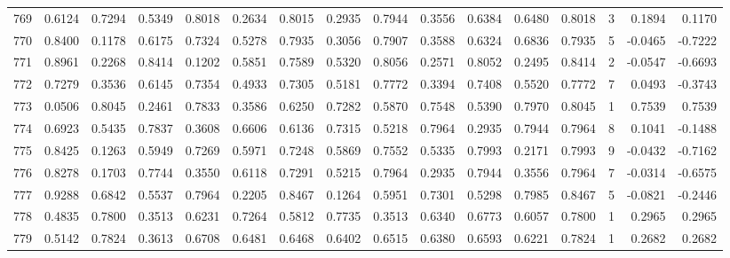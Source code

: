 \begin{tabular}{lrrrrrrrrrrrrrrr}
769 &      0.6124 &  0.7294 &  0.5349 &  0.8018 &  0.2634 &  0.8015 &  0.2935 &  0.7944 &  0.3556 &  0.6384 &   0.6480 &     0.8018 &      3 &                    0.1894 &                     0.1170 \\
770 &      0.8400 &  0.1178 &  0.6175 &  0.7324 &  0.5278 &  0.7935 &  0.3056 &  0.7907 &  0.3588 &  0.6324 &   0.6836 &     0.7935 &      5 &                   -0.0465 &                    -0.7222 \\
771 &      0.8961 &  0.2268 &  0.8414 &  0.1202 &  0.5851 &  0.7589 &  0.5320 &  0.8056 &  0.2571 &  0.8052 &   0.2495 &     0.8414 &      2 &                   -0.0547 &                    -0.6693 \\
772 &      0.7279 &  0.3536 &  0.6145 &  0.7354 &  0.4933 &  0.7305 &  0.5181 &  0.7772 &  0.3394 &  0.7408 &   0.5520 &     0.7772 &      7 &                    0.0493 &                    -0.3743 \\
773 &      0.0506 &  0.8045 &  0.2461 &  0.7833 &  0.3586 &  0.6250 &  0.7282 &  0.5870 &  0.7548 &  0.5390 &   0.7970 &     0.8045 &      1 &                    0.7539 &                     0.7539 \\
774 &      0.6923 &  0.5435 &  0.7837 &  0.3608 &  0.6606 &  0.6136 &  0.7315 &  0.5218 &  0.7964 &  0.2935 &   0.7944 &     0.7964 &      8 &                    0.1041 &                    -0.1488 \\
775 &      0.8425 &  0.1263 &  0.5949 &  0.7269 &  0.5971 &  0.7248 &  0.5869 &  0.7552 &  0.5335 &  0.7993 &   0.2171 &     0.7993 &      9 &                   -0.0432 &                    -0.7162 \\
776 &      0.8278 &  0.1703 &  0.7744 &  0.3550 &  0.6118 &  0.7291 &  0.5215 &  0.7964 &  0.2935 &  0.7944 &   0.3556 &     0.7964 &      7 &                   -0.0314 &                    -0.6575 \\
777 &      0.9288 &  0.6842 &  0.5537 &  0.7964 &  0.2205 &  0.8467 &  0.1264 &  0.5951 &  0.7301 &  0.5298 &   0.7985 &     0.8467 &      5 &                   -0.0821 &                    -0.2446 \\
778 &      0.4835 &  0.7800 &  0.3513 &  0.6231 &  0.7264 &  0.5812 &  0.7735 &  0.3513 &  0.6340 &  0.6773 &   0.6057 &     0.7800 &      1 &                    0.2965 &                     0.2965 \\
779 &      0.5142 &  0.7824 &  0.3613 &  0.6708 &  0.6481 &  0.6468 &  0.6402 &  0.6515 &  0.6380 &  0.6593 &   0.6221 &     0.7824 &      1 &                    0.2682 &                     0.2682 \\

\end{tabular}
